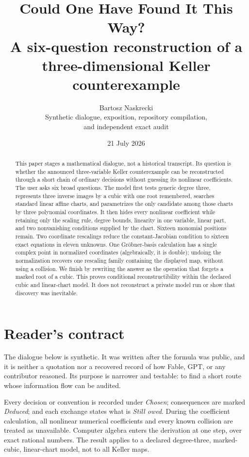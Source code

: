 \documentclass[11pt,a4paper]{article}
\title{\color{paperblue}\bfseries
  Could One Have Found It This Way?\\[1.5mm]
  \large A six-question reconstruction of a three-dimensional Keller counterexample}
\author{Bartosz Naskrecki\\
  \small Synthetic dialogue, exposition, repository compilation,\\
  \small and independent exact audit}
\date{21 July 2026}
\numberwithin{equation}{section}
\theoremstyle{definition}
\theoremstyle{remark}
\begin{document}
\maketitle

\begin{abstract}
This paper stages a mathematical dialogue, not a historical transcript.  Its
question is whether the announced three-variable Keller counterexample can be
reconstructed through a short chain of ordinary decisions without guessing
its nonlinear coefficients.  The user asks six broad questions.  The model
first tests generic degree three, represents three inverse images by a cubic
with one root remembered, searches standard linear affine charts, and
parametrizes the only candidate among those charts by three polynomial
coordinates.  It
then hides every nonlinear coefficient while retaining only the scaling rule,
degree bounds, linearity in one variable, linear part, and two nonvanishing
conditions supplied by the chart.  Sixteen monomial positions remain.  Two
coordinate rescalings reduce the constant-Jacobian condition to sixteen exact
equations in eleven unknowns.  One Gr\"obner-basis calculation has a single
complex point in normalized coordinates (algebraically, it is double);
undoing the normalization recovers one rescaling family containing the
displayed map, without using a collision.  We finish by rewriting the answer
as the operation that forgets
a marked root of a cubic.  This proves conditional reconstructibility within
the declared cubic and linear-chart model.  It does not reconstruct a
private model run or show that discovery was inevitable.
\end{abstract}

\section*{Reader's contract}

The dialogue below is synthetic.  It was written after the formula was
public, and it is neither a quotation nor a recovered record of how Fable,
GPT, or any contributor reasoned.  Its purpose is narrower and testable: to
find a short route whose information flow can be audited.

Every decision or convention is recorded under \emph{Chosen}; consequences
are marked \emph{Deduced}; and each exchange states what is \emph{Still
owed}.  During
the coefficient calculation, all nonlinear numerical coefficients and every
known collision are treated as unavailable.  Computer algebra enters the
derivation at one step, over exact rational numbers.  The result applies to a
declared degree-three,
marked-cubic, linear-chart model, not to all Keller maps.
\end{document}
